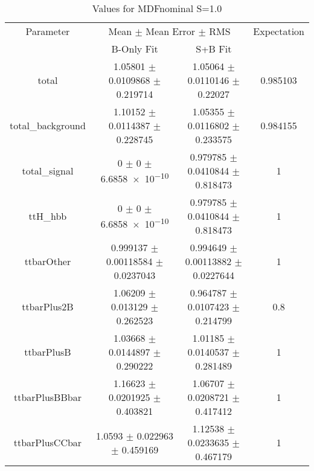 \begin{table}
\centering
\caption{Values for MDFnominal S=1.0}
\begin{tabular}{cccc}
\toprule
Parameter & \multicolumn{2}{c}{Mean $\pm$ Mean Error $\pm$ RMS} & Expectation\\
 & B-Only Fit & S+B Fit & \\
\midrule
total & \num{1.05801} $\pm$ \num{0.0109868} $\pm$ \num{0.219714} & \num{1.05064} $\pm$ \num{0.0110146} $\pm$ \num{0.22027} & \num{0.985103}\\
total\_background & \num{1.10152} $\pm$ \num{0.0114387} $\pm$ \num{0.228745} & \num{1.05355} $\pm$ \num{0.0116802} $\pm$ \num{0.233575} & \num{0.984155}\\
total\_signal & \num{0} $\pm$ \num{0} $\pm$ \num{6.6858e-10} & \num{0.979785} $\pm$ \num{0.0410844} $\pm$ \num{0.818473} & \num{1}\\
ttH\_hbb & \num{0} $\pm$ \num{0} $\pm$ \num{6.6858e-10} & \num{0.979785} $\pm$ \num{0.0410844} $\pm$ \num{0.818473} & \num{1}\\
ttbarOther & \num{0.999137} $\pm$ \num{0.00118584} $\pm$ \num{0.0237043} & \num{0.994649} $\pm$ \num{0.00113882} $\pm$ \num{0.0227644} & \num{1}\\
ttbarPlus2B & \num{1.06209} $\pm$ \num{0.013129} $\pm$ \num{0.262523} & \num{0.964787} $\pm$ \num{0.0107423} $\pm$ \num{0.214799} & \num{0.8}\\
ttbarPlusB & \num{1.03668} $\pm$ \num{0.0144897} $\pm$ \num{0.290222} & \num{1.01185} $\pm$ \num{0.0140537} $\pm$ \num{0.281489} & \num{1}\\
ttbarPlusBBbar & \num{1.16623} $\pm$ \num{0.0201925} $\pm$ \num{0.403821} & \num{1.06707} $\pm$ \num{0.0208721} $\pm$ \num{0.417412} & \num{1}\\
ttbarPlusCCbar & \num{1.0593} $\pm$ \num{0.022963} $\pm$ \num{0.459169} & \num{1.12538} $\pm$ \num{0.0233635} $\pm$ \num{0.467179} & \num{1}\\
\bottomrule
\end{tabular}
\end{table}